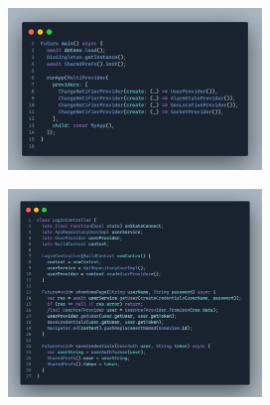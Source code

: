 \label{apendix:configuracion-aplicacion-movil}
\begin{figure}[H]
    \centering
    \includegraphics[width=0.6\textwidth]{chapters/appendices/code/configuracion-aplicacion-movil.png}
\end{figure}


\label{apendix:guardar-token-movil}
\begin{figure}[H]
    \centering
    \includegraphics[width=0.6\textwidth]{chapters/appendices/code/guardar-token-movil.png}
\end{figure}




